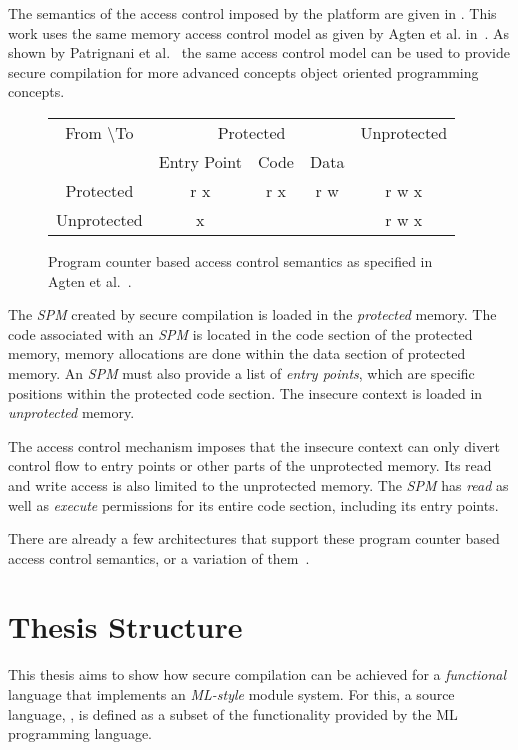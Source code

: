The semantics of the access control imposed by the platform are given in .
This work uses the same memory access control model as given by Agten et al. in~\cite{Agten:2012:SCM:2354412.2355247}.
As shown by Patrignani et al.~\cite{Patrignani} the same access control model can be used to provide secure compilation for more advanced concepts object oriented programming concepts.

\begin{figure}[htb]
    \centering
	\begin{tabular}{|c|c|c|c|c|}
		\hline
		From \textbackslash To & \multicolumn{3}{c|}{Protected} & Unprotected \\
		& Entry Point & Code & Data & \\ \hline
		Protected & r x & r x & r w & r w x \\ \hline
		Unprotected & x & & & r w x \\ \hline
	\end{tabular}
    \caption[PCBAC Semantics]{Program counter based access control semantics as specified in Agten et al.~\cite{Agten:2012:SCM:2354412.2355247}. \label{fig:AccessControlSemantics}}
\end{figure}

The \emph{SPM} created by secure compilation is loaded in the \emph{protected} memory.
The code associated with an \emph{SPM} is located in the code section of the protected memory, memory allocations are done within the data section of protected memory.
An \emph{SPM} must also provide a list of \emph{entry points}, which are specific positions within the protected code section.
The insecure context is loaded in \emph{unprotected} memory.

The access control mechanism imposes that the insecure context can only divert control flow to entry points or other parts of the unprotected memory.
Its read and write access is also limited to the unprotected memory.
The \emph{SPM} has \emph{read} as well as \emph{execute} permissions for its entire code section, including its entry points.

There are already a few architectures that support these program counter based access control semantics, or a variation of them~\cite{Fides, Salus, Sancus}.

\section{Thesis Structure}
This thesis aims to show how secure compilation can be achieved for a \emph{functional} language that implements an \emph{ML-style} module system.
For this, a source language, \emph{\MiniML}, is defined as a subset of the functionality provided by the ML programming language.

